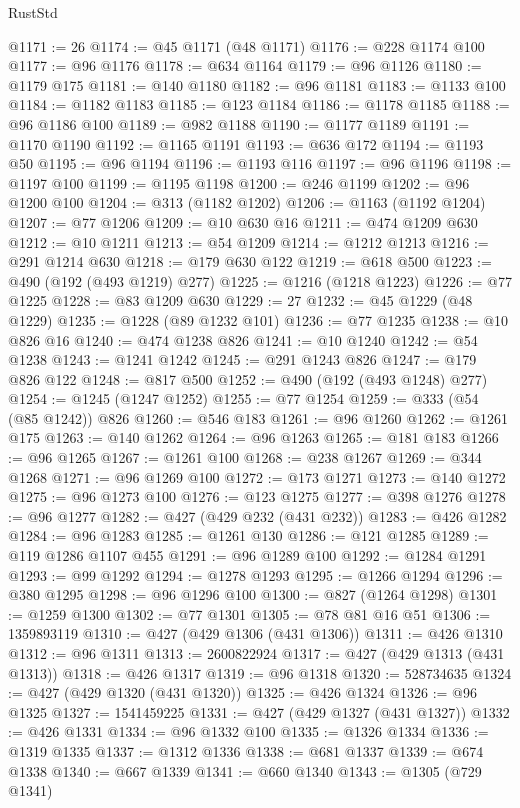 \begin{lexlean}{RustStd}
\begin{coremodule}
@1171 := 26
@1174 := @45 @1171 (@48 @1171)
@1176 := @228 @1174 @100
@1177 := @96 @1176
@1178 := @634 @1164
@1179 := @96 @1126
@1180 := @1179 @175
@1181 := @140 @1180
@1182 := @96 @1181
@1183 := @1133 @100
@1184 := @1182 @1183
@1185 := @123 @1184
@1186 := @1178 @1185
@1188 := @96 @1186 @100
@1189 := @982 @1188
@1190 := @1177 @1189
@1191 := @1170 @1190
@1192 := @1165 @1191
@1193 := @636 @172
@1194 := @1193 @50
@1195 := @96 @1194
@1196 := @1193 @116
@1197 := @96 @1196
@1198 := @1197 @100
@1199 := @1195 @1198
@1200 := @246 @1199
@1202 := @96 @1200 @100
@1204 := @313 (@1182 @1202)
@1206 := @1163 (@1192 @1204)
@1207 := @77 @1206
@1209 := @10 @630 @16
@1211 := @474 @1209 @630
@1212 := @10 @1211
@1213 := @54 @1209
@1214 := @1212 @1213
@1216 := @291 @1214 @630
@1218 := @179 @630 @122
@1219 := @618 @500
@1223 := @490 (@192 (@493 @1219) @277)
@1225 := @1216 (@1218 @1223)
@1226 := @77 @1225
@1228 := @83 @1209 @630
@1229 := 27
@1232 := @45 @1229 (@48 @1229)
@1235 := @1228 (@89 @1232 @101)
@1236 := @77 @1235
@1238 := @10 @826 @16
@1240 := @474 @1238 @826
@1241 := @10 @1240
@1242 := @54 @1238
@1243 := @1241 @1242
@1245 := @291 @1243 @826
@1247 := @179 @826 @122
@1248 := @817 @500
@1252 := @490 (@192 (@493 @1248) @277)
@1254 := @1245 (@1247 @1252)
@1255 := @77 @1254
@1259 := @333 (@54 (@85 @1242)) @826
@1260 := @546 @183
@1261 := @96 @1260
@1262 := @1261 @175
@1263 := @140 @1262
@1264 := @96 @1263
@1265 := @181 @183
@1266 := @96 @1265
@1267 := @1261 @100
@1268 := @238 @1267
@1269 := @344 @1268
@1271 := @96 @1269 @100
@1272 := @173 @1271
@1273 := @140 @1272
@1275 := @96 @1273 @100
@1276 := @123 @1275
@1277 := @398 @1276
@1278 := @96 @1277
@1282 := @427 (@429 @232 (@431 @232))
@1283 := @426 @1282
@1284 := @96 @1283
@1285 := @1261 @130
@1286 := @121 @1285
@1289 := @119 @1286 @1107 @455
@1291 := @96 @1289 @100
@1292 := @1284 @1291
@1293 := @99 @1292
@1294 := @1278 @1293
@1295 := @1266 @1294
@1296 := @380 @1295
@1298 := @96 @1296 @100
@1300 := @827 (@1264 @1298)
@1301 := @1259 @1300
@1302 := @77 @1301
@1305 := @78 @81 @16 @51
@1306 := 1359893119
@1310 := @427 (@429 @1306 (@431 @1306))
@1311 := @426 @1310
@1312 := @96 @1311
@1313 := 2600822924
@1317 := @427 (@429 @1313 (@431 @1313))
@1318 := @426 @1317
@1319 := @96 @1318
@1320 := 528734635
@1324 := @427 (@429 @1320 (@431 @1320))
@1325 := @426 @1324
@1326 := @96 @1325
@1327 := 1541459225
@1331 := @427 (@429 @1327 (@431 @1327))
@1332 := @426 @1331
@1334 := @96 @1332 @100
@1335 := @1326 @1334
@1336 := @1319 @1335
@1337 := @1312 @1336
@1338 := @681 @1337
@1339 := @674 @1338
@1340 := @667 @1339
@1341 := @660 @1340
@1343 := @1305 (@729 @1341)

\end{coremodule}
\end{lexlean}

